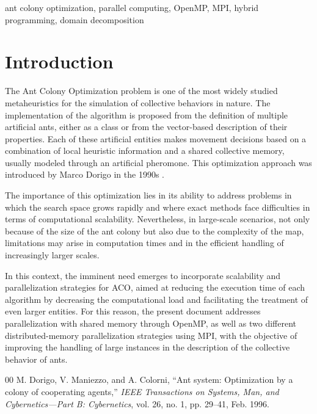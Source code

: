 \documentclass[conference]{IEEEtran}
\begin{document}
\begin{IEEEkeywords}
ant colony optimization, parallel computing, OpenMP, MPI, hybrid programming, domain decomposition
\end{IEEEkeywords}

\section{Introduction}
The Ant Colony Optimization problem is one of the most widely studied metaheuristics for the simulation of collective behaviors in nature. The implementation of the algorithm is proposed from the definition of multiple artificial ants, either as a class or from the vector-based description of their properties. Each of these artificial entities makes movement decisions based on a combination of local heuristic information and a shared collective memory, usually modeled through an artificial pheromone. This optimization approach was introduced by Marco Dorigo in the 1990s \cite{Dorigo}.

The importance of this optimization lies in its ability to address problems in which the search space grows rapidly and where exact methods face difficulties in terms of computational scalability. Nevertheless, in large-scale scenarios, not only because of the size of the ant colony but also due to the complexity of the map, limitations may arise in computation times and in the efficient handling of increasingly larger scales.

In this context, the imminent need emerges to incorporate scalability and parallelization strategies for ACO, aimed at reducing the execution time of each algorithm by decreasing the computational load and facilitating the treatment of even larger entities. For this reason, the present document addresses parallelization with shared memory through OpenMP, as well as two different distributed-memory parallelization strategies using MPI, with the objective of improving the handling of large instances in the description of the collective behavior of ants.


\clearpage

\begin{thebibliography}{00}
 M. Dorigo, V. Maniezzo, and A. Colorni, ``Ant system: Optimization by a colony of cooperating agents,'' \textit{IEEE Transactions on Systems, Man, and Cybernetics---Part B: Cybernetics}, vol. 26, no. 1, pp. 29--41, Feb. 1996.
\end{thebibliography}
\end{document}
